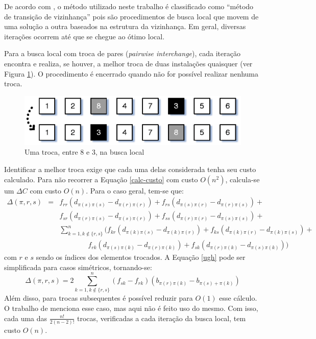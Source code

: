 De acordo com \cite{gutin-punnen}, o método utilizado neste trabalho é
classificado como ``método de transição de vizinhança'' pois são
procedimentos de busca local que movem de uma solução a outra baseados
na estrutura da vizinhança. Em geral, diversas iterações ocorrem até
que se chegue ao ótimo local.

Para a busca local com troca de pares (\textit{pairwise interchange}),
cada iteração encontra e realiza, se houver, a melhor troca de duas
instalações quaisquer (ver Figura \ref{fig:localstep}).
O procedimento é encerrado quando não for possível realizar nenhuma
troca.

\begin{figure}[ht!]
  \centering
  \includegraphics[scale=0.65]{pairchange}
  \caption{Uma troca, entre 8 e 3, na busca local\label{fig:localstep}}
\end{figure}

Identificar a melhor troca exige que cada uma delas considerada tenha
seu custo calculado. Para não recorrer a Equação \ref{calc-custo} com
custo $O(n^2)$, calcula-se um $\Delta C$ com custo $O(n)$.
Para o caso geral, tem-se que:
\begin{eqnarray}\label{ugh}
\Delta(\pi, r, s) &=& f_{rr} (d_{\pi(s)\pi(s)} - d_{\pi(r)\pi(r)}) +
f_{rs} (d_{\pi(s)\pi(r)} - d_{\pi(r)\pi(s)}) + \nonumber \\
& & f_{sr} (d_{\pi(r)\pi(s)} - d_{\pi(s)\pi(r)}) + f_{ss} (d_{\pi(r)\pi(r)} -
d_{\pi(s)\pi(s)}) + \\
& & \sum_{k = 1, k \not \in \{r, s\}}^{n} (f_{kr} (d_{\pi(k)\pi(s)} -
d_{\pi(k)\pi(r)}) + f_{ks} (d_{\pi(k)\pi(r)} - d_{\pi(k)\pi(s)}) + \nonumber \\
& & \quad \quad \quad \quad f_{rk} (d_{\pi(s)\pi(k)} - d_{\pi(r)\pi(k)}) + f_{sk}
(d_{\pi(r)\pi(k)} - d_{\pi(s)\pi(k)})) \nonumber
\end{eqnarray}
com $r$ e $s$ sendo os índices dos elementos trocados. A Equação
\ref{ugh} pode ser simplificada para casos simétricos, tornando-se:
\begin{equation}
\Delta(\pi, r, s) = 2 \sum_{k = 1, k \not \in \{r, s\}}^{n} (f_{sk}
- f_{rk}) (b_{\pi(r)\pi(k)} - b_{\pi(s) + \pi(k)})
\end{equation}
Além disso, para trocas subsequentes é possível reduzir para $O(1)$
esse cálculo. O trabalho de \cite{taillard1} menciona esse caso, mas
aqui não é feito uso do mesmo. Com isso, cada uma das $\frac{n!}{2 (n -
  2)!}$ trocas, verificadas a cada iteração da busca local, tem custo
$O(n)$. %


